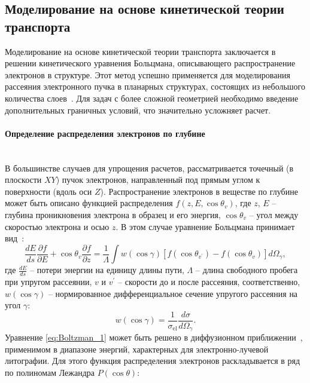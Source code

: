 \subsection{Моделирование на основе кинетической теории транспорта}
Моделирование на основе кинетической теории транспорта заключается в решении кинетического уравнения Больцмана, описывающего распространение электронов в структуре. Этот метод успешно применяется для моделирования рассеяния электронного пучка в планарных структурах, состоящих из небольшого количества слоев~\cite{Stepanova_2006, Stepanova_2010}. Для задач с более сложной геометрией необходимо введение дополнительных граничных условий, что значительно усложняет расчет.


\paragraph{Определение распределения электронов по глубине} \mbox{} \\
\indent В большинстве случаев для упрощения расчетов, рассматривается точечный (в плоскости $XY$) пучок электронов, направленный под прямым углом к поверхности (вдоль оси $Z$). Распространение электронов в веществе по глубине может быть описано функцией распределения $f(z, E, \cos \theta_v)$, где $z$, $E$ -- глубина проникновения электрона в образец и его энергия, $\cos \theta_v$ -- угол между скоростью электрона и осью $z$. В этом случае уравнение Больцмана принимает вид~\cite{ME_rev_60}:
\begin{equation} \label{eq:Boltzman_1}
	\frac{d E}{d s} \frac{\partial f}{\partial E}+\cos \theta_v \frac{\partial f}{\partial z}=\frac{1}{\Lambda} \int w(\cos \gamma)\left[f\left(\cos \theta_{v^{\prime}}\right)-f\left(\cos \theta_v\right)\right] d \Omega_\gamma,
\end{equation}
где $\frac{dE}{ds}$ -- потери энергии на единицу длины пути, $\Lambda$ -- длина свободного пробега при упругом рассеянии, $v$ и $v^{\prime}$ -- скорости до и после рассеяния, соответственно, $w(\cos \gamma)$ -- нормированное дифференциальное сечение упругого рассеяния на угол $\gamma$:
\begin{equation} \label{eq:Boltzman_2}
	w(\cos \gamma)=\frac{1}{\sigma_{\mathrm{el}}} \frac{d \sigma}{d \Omega_\gamma}.
\end{equation}
Уравнение \ref{eq:Boltzman_1} может быть решено в диффузионном приближении~\cite{ME_rev_61}, применимом в диапазоне энергий, характерных для электронно-лучевой литографии. Для этого функция распределения электронов раскладывается в ряд по полиномам Лежандра $P(\cos \theta)$:
